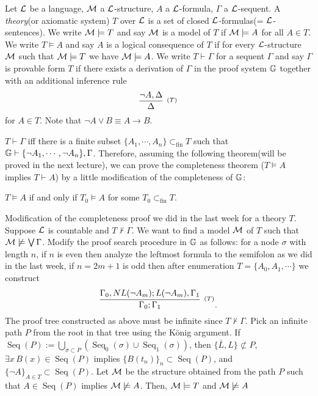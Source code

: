 \documentclass{../../small}
\DeclareMathOperator{\Seq}{Seq}
\begin{document}
\begin{defn*}
Let $\mathcal{L}$ be a language, $\mathcal{M}$ a $\mathcal{L}$-structure, $A$ a $\mathcal{L}$-formula, $\Gamma$ a $\mathcal{L}$-sequent.
A \emph{theory}(or axiomatic system) $T$ over $\mathcal{L}$ is a set of closed $\mathcal{L}$-formulas(= $\mathcal{L}$-sentences).
We write $\mathcal{M}\models T$ and say $\mathcal{M}$ is a model of $T$ if $\mathcal{M}\models A$ for all $A\in T$.
We write $T\models A$ and say $A$ is a logical consequence of $T$ if for every $\mathcal{L}$-structure $\mathcal{M}$ such that $\mathcal{M}\models T$ we have $\mathcal{M}\models A$.
We write $T\vdash\Gamma$ for a sequent $\Gamma$ and say $\Gamma$ is provable form $T$ if there exists a derivation of $\Gamma$ in the proof system $\mathbb{G}$ together with an additional inference rule
\[\infer[^{(T)}]{\Delta}{\neg A,\Delta}\]
for $A\in T$.
Note that $\neg A\vee B\equiv A\to B$.
\end{defn*}
\begin{rmk*}
$T\vdash\Gamma$ iff there is a finite subset $\{A_1,\cdots,A_n\}\subset_{\mathrm{fin}}T$ such that $\mathbb{G}\vdash\{\neg A_1,\cdots,\neg A_n\},\Gamma$.
Therefore, assuming the following theorem(will be proved in the next lecture), we can prove the completeness theorem ($T\models A$ implies $T\vdash A$) by a little modification of the completeness of $\mathbb{G}$:
\end{rmk*}
\begin{thm*}[Compactness]
$T\models A$ if and only if $T_0\models A$ for some $T_0\subset_{\mathrm{fin}}T$.
\end{thm*}


Modification of the completeness proof we did in the last week for a theory $T$.
Suppose $\mathcal{L}$ is countable and $T\not\vdash\Gamma$.
We want to find a model $\mathcal{M}$ of $T$ such that $\mathcal{M}\not\models \bigvee\Gamma$.
Modify the proof search procedure in $\mathbb{G}$ as follows:
for a node $\sigma$ with length $n$, if $n$ is even then analyze the leftmost formula to the semifolon as we did in the last week, if $n=2m+1$ is odd then after enumeration $T=\{A_0,A_1,\cdots\}$ we construct
\[\infer[^{(T)}]{\Gamma_0;\Gamma_1}{\Gamma_0,NL(\neg A_m);L(\neg A_m),\Gamma_1}.\]
The proof tree constructed as above must be infinite since $T\not\vdash\Gamma$.
Pick an infinite path $P$ from the root in that tree using the K\"onig argument.
If $\Seq(P):=\bigcup_{\sigma\subset P}(\Seq_0(\sigma)\cup\Seq_1(\sigma))$, then $\{\bar L,L\}\not\subset P$, $\exists x\,B(x)\in\Seq(P)$ implies $\{B(t_n)\}_n\subset\Seq(P)$, and $\{\neg A\}_{A\in T}\subset\Seq(P)$.
Let $\mathcal{M}$ be the structure obtained from the path $P$ such that $A\in\Seq(P)$ implies $\mathcal{M}\not\models A$.
Then, $\mathcal{M}\models T$ and $\mathcal{M}\not\models A$
\end{document}
